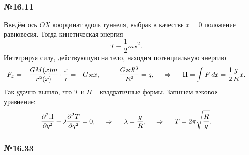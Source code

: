 


\subsubsection*{№16.11}

Введём ось $OX$ координат вдоль туннеля, выбрав в качестве $x=0$ положение равновесия. Тогда кинетическая энергия
\begin{equation*}
    T = \frac{1}{2} m \dot{x}^2.
\end{equation*}
Интегрируя силу, действующую на тело, находим потенциальную энергию
\begin{equation*}
    F_x = -\frac{G M(x) m}{r^2(x)} \cdot \frac{x}{r} = - G \varkappa x,
    \hspace{1 cm}
    \frac{G \varkappa R^3}{R^2} = g,
    \hspace{0.5cm} \Rightarrow \hspace{0.5cm}
    \Pi = \int F \, d x = \frac{1}{2}\frac{g}{R} x.
\end{equation*}
Так удачно вышло, что $T$ и $\Pi$ -- квадратичные формы. Запишем вековое уравнение:
\begin{equation*}
     \frac{\partial^2 \Pi}{\partial q^2} - \lambda \frac{\partial^2 T}{\partial \dot{q}^2} = 0,
     \hspace{0.5cm} \Rightarrow \hspace{0.5cm}
     \lambda = \frac{g}{R},
     \hspace{0.5cm} \Rightarrow \hspace{0.5cm}
     T = 2 \pi \sqrt{\frac{R}{g}}.
\end{equation*}


\subsubsection*{№16.33}

